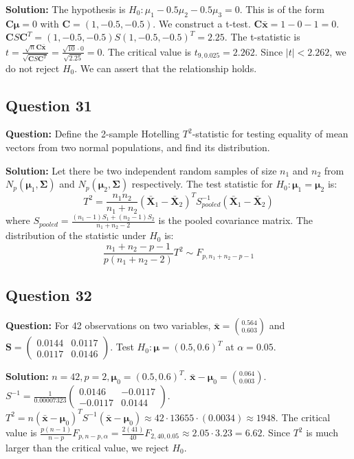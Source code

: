 \textbf{Solution:}
The hypothesis is $H_0: \mu_1 - 0.5\mu_2 - 0.5\mu_3 = 0$. This is of the form $\mathbf{C}\boldsymbol{\mu}=0$ with $\mathbf{C}=(1, -0.5, -0.5)$. We construct a t-test.
$\mathbf{C}\bar{\mathbf{x}} = 1 - 0 - 1 = 0$.
$\mathbf{C}S\mathbf{C}^T = (1, -0.5, -0.5) S (1, -0.5, -0.5)^T = 2.25$.
The t-statistic is $t = \frac{\sqrt{n}\mathbf{C}\bar{\mathbf{x}}}{\sqrt{\mathbf{C}S\mathbf{C}^T}} = \frac{\sqrt{10} \cdot 0}{\sqrt{2.25}} = 0$.
The critical value is $t_{9, 0.025} = 2.262$. Since $|t| < 2.262$, we do not reject $H_0$. We can assert that the relationship holds.

\subsection*{Question 31}
\textbf{Question:} Define the 2-sample Hotelling $T^2$-statistic for testing equality of mean vectors from two normal populations, and find its distribution.

\textbf{Solution:}
Let there be two independent random samples of size $n_1$ and $n_2$ from $N_p(\boldsymbol{\mu}_1, \boldsymbol{\Sigma})$ and $N_p(\boldsymbol{\mu}_2, \boldsymbol{\Sigma})$ respectively.
The test statistic for $H_0: \boldsymbol{\mu}_1 = \boldsymbol{\mu}_2$ is:
$$ T^2 = \frac{n_1 n_2}{n_1+n_2}(\bar{\mathbf{X}}_1 - \bar{\mathbf{X}}_2)^T S_{pooled}^{-1} (\bar{\mathbf{X}}_1 - \bar{\mathbf{X}}_2) $$
where $S_{pooled} = \frac{(n_1-1)S_1 + (n_2-1)S_2}{n_1+n_2-2}$ is the pooled covariance matrix.
The distribution of the statistic under $H_0$ is:
$$ \frac{n_1+n_2-p-1}{p(n_1+n_2-2)} T^2 \sim F_{p, n_1+n_2-p-1} $$

\subsection*{Question 32}
\textbf{Question:} For 42 observations on two variables, $\bar{\mathbf{x}} = \binom{0.564}{0.603}$ and $\mathbf{S} = \begin{pmatrix} 0.0144 & 0.0117 \\ 0.0117 & 0.0146 \end{pmatrix}$. Test $H_0: \boldsymbol{\mu} = (0.5, 0.6)^T$ at $\alpha=0.05$.

\textbf{Solution:}
$n=42, p=2, \boldsymbol{\mu}_0 = (0.5, 0.6)^T$.
$\bar{\mathbf{x}}-\boldsymbol{\mu}_0 = \binom{0.064}{0.003}$.
$S^{-1} = \frac{1}{0.00007323}\begin{pmatrix} 0.0146 & -0.0117 \\ -0.0117 & 0.0144 \end{pmatrix}$.
$T^2 = n(\bar{\mathbf{x}}-\boldsymbol{\mu}_0)^T S^{-1} (\bar{\mathbf{x}}-\boldsymbol{\mu}_0) \approx 42 \cdot 13655 \cdot (0.0034) \approx 1948$.
The critical value is $\frac{p(n-1)}{n-p}F_{p,n-p,\alpha} = \frac{2(41)}{40}F_{2,40,0.05} \approx 2.05 \cdot 3.23 = 6.62$.
Since $T^2$ is much larger than the critical value, we reject $H_0$.

